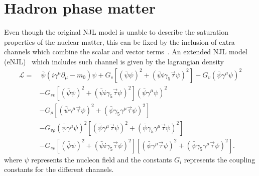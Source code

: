 \documentclass{ws-ijmpcs}
\begin{document}
\section{Hadron phase matter}

Even though the original NJL model is unable to describe the saturation properties of the nuclear matter, this can be fixed by the inclusion of extra channels which combine the scalar and vector terms~\cite{Koch1987}. An extended NJL model (eNJL)~\cite{Pais2016} which includes such channel is given by the lagrangian density
\begin{equation}\label{Eq:Lagrangiana_eNLJ_Pais}
\begin{split}
	\mathcal{L} =&~ \bar{\psi}(i\gamma^\mu\partial_\mu - m_0)\psi + G_s[(\bar{\psi}\psi)^2 + (\bar{\psi}i\gamma_5\vec{\tau}\psi)^2] - G_v(\bar{\psi}\gamma^\mu\psi)^2 \\
	& - G_{sv}[(\bar{\psi}\psi)^2 + (\bar{\psi}i\gamma_5\vec{\tau}\psi)^2](\bar{\psi}\gamma^\mu\psi)^2 \\
	& - G_\rho[(\bar{\psi}\gamma^\mu\vec{\tau}\psi)^2 + (\bar{\psi}\gamma_5\gamma^\mu\vec{\tau}\psi)^2] \\
	& - G_{v\rho}(\bar{\psi}\gamma^\mu\psi)^2[(\bar{\psi}\gamma^\mu\vec{\tau}\psi)^2 + (\bar{\psi}\gamma_5\gamma^\mu\vec{\tau}\psi)^2] \\
	& - G_{s\rho} [(\bar{\psi}\psi)^2 + (\bar{\psi}i\gamma_5\vec{\tau}\psi)^2][(\bar{\psi}\gamma^\mu\vec{\tau}\psi)^2 + (\bar{\psi}\gamma_5\gamma^\mu\vec{\tau}\psi)^2].
\end{split}
\end{equation}
%
where $\psi$ represents the nucleon field and the constants $G_i$ represents the coupling constants for the different channels.
\end{document}
